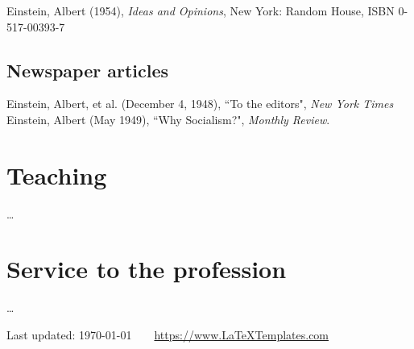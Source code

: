\documentclass[11pt]{article} %
\begin{document}
Einstein, Albert (1954), \emph{Ideas and Opinions}, New York: Random House, ISBN 0-517-00393-7


\subsection*{Newspaper articles}

Einstein, Albert, et al. (December 4, 1948), “To the editors", \emph{New York Times}\\
Einstein, Albert (May 1949), “Why Socialism?", \emph{Monthly Review}.


\section*{Teaching}

\ldots


\section*{Service to the profession}

\ldots

\vfill %


\begin{center}
	\scriptsize
	Last updated: \today~~\raisebox{-0.5pt}{\textbullet}~~\href{https://www.LaTeXTemplates.com}{https://www.LaTeXTemplates.com}
\end{center}

\end{document}
